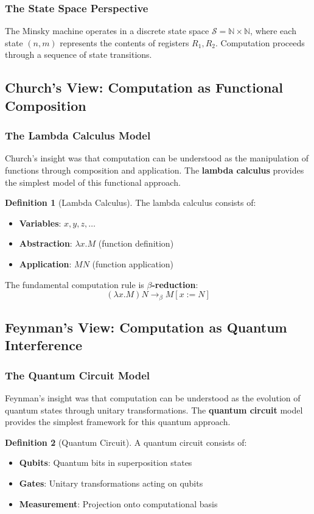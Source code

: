 \documentclass[11pt,a4paper]{article}
\theoremstyle{definition}
\newtheorem{definition}{Definition}[section]
\begin{document}
\subsubsection{The State Space Perspective}
The Minsky machine operates in a discrete state space $\mathcal{S} = \mathbb{N} \times \mathbb{N}$, where each state $(n,m)$ represents the contents of registers $R_1, R_2$. Computation proceeds through a sequence of state transitions.

\subsection{Church's View: Computation as Functional Composition}
\subsubsection{The Lambda Calculus Model}
Church's insight was that computation can be understood as the manipulation of functions through composition and application. The \textbf{lambda calculus} provides the simplest model of this functional approach.

\begin{definition}[Lambda Calculus]
The lambda calculus consists of:
\begin{itemize}
\item \textbf{Variables}: $x, y, z, \ldots$
\item \textbf{Abstraction}: $\lambda x.M$ (function definition)
\item \textbf{Application}: $MN$ (function application)
\end{itemize}
The fundamental computation rule is \textbf{$\beta$-reduction}:
$$(\lambda x.M)N \to_\beta M[x := N]$$
\end{definition}

\subsection{Feynman's View: Computation as Quantum Interference}
\subsubsection{The Quantum Circuit Model}
Feynman's insight was that computation can be understood as the evolution of quantum states through unitary transformations. The \textbf{quantum circuit} model provides the simplest framework for this quantum approach.

\begin{definition}[Quantum Circuit]
A quantum circuit consists of:
\begin{itemize}
\item \textbf{Qubits}: Quantum bits in superposition states
\item \textbf{Gates}: Unitary transformations acting on qubits
\item \textbf{Measurement}: Projection onto computational basis
\end{itemize}
\end{definition}
\end{document}
